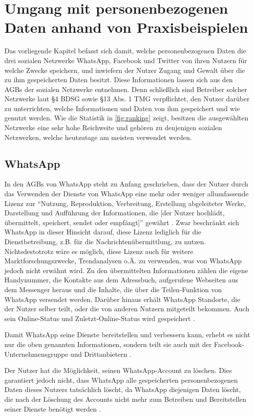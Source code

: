 



\chapter{Umgang mit personenbezogenen Daten anhand von Praxisbeispielen}
Das vorliegende Kapitel befasst sich damit, welche personenbezogenen Daten die drei sozialen Netzwerke WhatsApp, Facebook und Twitter von ihren Nutzern für welche Zwecke speichern, und inwiefern der Nutzer Zugang und Gewalt über die zu ihm gespeicherten Daten besitzt. Diese Informationen lassen sich aus den AGBs der sozialen Netzwerke entnehmen. Denn schließlich sind Betreiber solcher Netzwerke laut §4 BDSG sowie §13 Abs. 1 TMG verpflichtet, den Nutzer darüber zu unterrichten, welche Informationen und Daten von ihm gespeichert und wie genutzt werden. Wie die Statistik in \vref{fig:ranking} zeigt, besitzen die ausgewählten Netzwerke eine sehr hohe Reichweite und gehören zu denjenigen sozialen Netzwerken, welche heutzutage am meisten verwendet werden.

\section{WhatsApp}
In den AGBs von WhatsApp steht zu Anfang geschrieben, dass der Nutzer durch das Verwenden der Dienste von WhatsApp eine mehr oder weniger allumfassende Lizenz zur "`Nutzung, Reproduktion, Verbreitung, Erstellung abgeleiteter Werke, Darstellung und Aufführung der Informationen, die [der Nutzer hochlädt, übermittelt, speichert, sendet oder empfängt]"' gewährt \autocite[][]{WhatsAppInc..2017}. Zwar beschränkt sich WhatsApp in dieser Hinsicht darauf, diese Lizenz lediglich für die Dienstbetreibung, z.B. für die Nachrichtenübermittlung, zu nutzen. Nichtsdestotrotz wäre es möglich, diese Lizenz auch für weitere Marktforschungszwecke, Trendanalysen o.Ä. zu verwenden, was von WhatsApp jedoch nicht erwähnt wird. Zu den übermittelten Informationen zählen die eigene Handynummer, die Kontakte aus dem Adressbuch, aufgerufene Webseiten aus dem Messenger heraus und die Inhalte, die über die Teilen-Funktion von WhatsApp versendet werden. Darüber hinaus erhält WhatsApp Standorte, die der Nutzer selber teilt, oder die von anderen Nutzern mitgeteilt bekommen. Auch sein Online-Status und Zuletzt-Online-Status wird gespeichert \autocite[vgl.][]{WhatsAppInc..2017}.
\par
Damit WhatsApp seine Dienste bereitstellen und verbessern kann, erhebt es nicht nur die oben genannten Informationen, sondern teilt sie auch mit der Facebook-Unternehmensgruppe und Drittanbietern \autocite[vgl.][]{WhatsAppInc..2017}.
\par
Der Nutzer hat die Möglichkeit, seinen WhatsApp-Account zu löschen. Dies garantiert jedoch nicht, dass WhatsApp alle gespeicherten personenbezogenen Daten dieses Nutzers tatsächlich löscht, da WhatsApp diejenigen Daten löscht, die nach der Löschung des Accounts nicht mehr zum Betreiben und Bereitstellen seiner Dienste benötigt werden \autocite[vgl.][]{WhatsAppInc..2017}.

